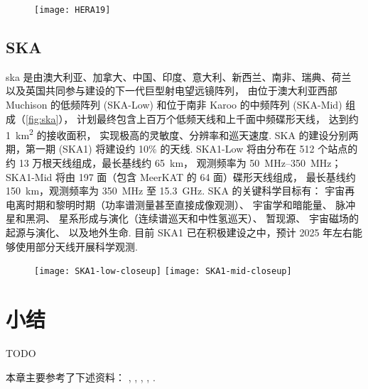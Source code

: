 \begin{figure}[htp]
  \centering
  \texttt{[image: HERA19]}
  \label{fig:hera}
\end{figure}

\subsection{SKA}

\acf{ska} 是由澳大利亚、加拿大、中国、印度、意大利、新西兰、南非、瑞典、荷兰
以及英国共同参与建设的下一代巨型射电望远镜阵列，
由位于澳大利亚西部 Muchison 的低频阵列 (SKA-Low)
和位于南非 Karoo 的中频阵列 (SKA-Mid) 组成（\autoref{fig:ska}），
计划最终包含上百万个低频天线和上千面中频碟形天线，
达到约 \SI{1}{\km\squared} 的接收面积，
实现极高的灵敏度、分辨率和巡天速度.
SKA 的建设分别两期，第一期 (SKA1) 将建设约 10\% 的天线.
SKA1-Low 将由分布在 512 个站点的约 13 万根天线组成，最长基线约 \SI{65}{\km}，
观测频率为 \SIrange{50}{350}{\MHz}；
SKA1-Mid 将由 197 面（包含 MeerKAT 的 64 面）碟形天线组成，
最长基线约 \SI{150}{\km}，观测频率为 \SI{350}{\MHz} 至 \SI{15.3}{\GHz}.
SKA 的关键科学目标有\cite{braun2015}：
宇宙再电离时期和黎明时期（功率谱测量甚至直接成像观测）\cite{mellema2013,mellema2015,koopmans2015}、
宇宙学和暗能量\cite{maartens2015,santos2015}、
脉冲星和黑洞\cite{kramer2015}、
星系形成与演化（连续谱巡天和中性氢巡天）\cite{prandoni2015,staveley2015}、
暂现源\cite{fender2015}、
宇宙磁场的起源与演化\cite{johnston2015}、
以及地外生命\cite{hoare2015}.
目前 SKA1 已在积极建设之中，预计 2025 年左右能够使用部分天线开展科学观测.

\begin{figure}[htp]
  \centering
  \texttt{[image: SKA1-low-closeup]}%
  \texttt{[image: SKA1-mid-closeup]}
  \label{fig:ska}
\end{figure}


\section{小结}

TODO

本章主要参考了下述资料：
, , ,
, .

